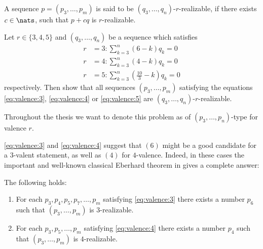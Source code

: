 \begin{definition}\label{def:eberhard:realizable}
  A sequence $p = (p_3, \dots, p_m)$ is said to be $(q_3, \dots, q_n)$-$r$-realizable, if there exists $c \in \nats$, such that $p + c q$ is $r$-realizable.
\end{definition}
\begin{problem}\label{problem:eberhard}
  Let $r \in \{3, 4, 5\}$ and $(q_3, \dots, q_n)$ be a sequence which satisfies
  \begin{align}
    r &= 3: \sum_{k=3}^n \left( 6            - k \right) q_k = 0 \label{eq:zero:curv:3}\\
    r &= 4: \sum_{k=3}^n \left( 4            - k \right) q_k = 0 \label{eq:zero:curv:4}\\
    r &= 5: \sum_{k=3}^n \left( \frac{10}{3} - k \right) q_k = 0 \label{eq:zero:curv:5}
  \end{align}
  respectively. Then show that all sequences $(p_3, \dots, p_m)$ satisfying the equations \ref{eq:valence:3}, \ref{eq:valence:4} or \ref{eq:valence:5} are $(q_3, \dots, q_n)$-$r$-realizable.
\end{problem}
\begin{notation}
  Throughout the thesis we want to denote this problem as of $(p_3, \dots, p_n)$-type for valence $r$.
\end{notation}
\autoref{eq:valence:3} and \autoref{eq:valence:4} suggest that $(6)$ might be a good candidate for a $3$-valent statement, as well as $(4)$ for $4$-valence. Indeed, in these cases the important and well-known classical Eberhard theorem in \cite{ConvexPolytopes} gives a complete answer:
\renewcommand{\Itemautorefname}{Theorem \ref{thm:eberhard}}
\begin{theorem} \label{thm:eberhard} The following holds:
  \begin{enumerate}[label=(\roman*)]
  \item \label{thm:eberhard:3} For each $p_3, p_4, p_5, p_7, \dots, p_m$ satisfying \autoref{eq:valence:3} there exists a number $p_6$ such that $(p_3, \dots, p_m)$ is $3$-realizable.
  \item \label{thm:eberhard:4} For each $p_3, p_5, \dots, p_m$ satisfying \autoref{eq:valence:4} there exists a number $p_4$ such that $(p_3, \dots, p_m)$ is $4$-realizable.
  \end{enumerate}
\end{theorem}

